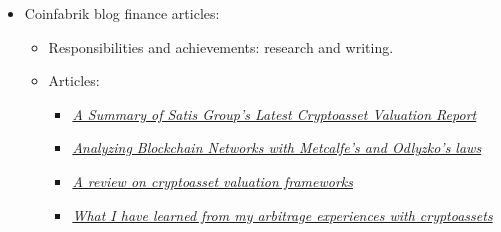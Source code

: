 \documentclass[11pt,a4paper,sans]{moderncv}        %
\begin{document}
{\begin{itemize}
\begin{itemize}
	\item Responsibilities and achievements: Product owner.
	\end{itemize}
\item Coinfabrik blog finance articles:
	\begin{itemize}%
	\item Responsibilities and achievements: research and writing.
	\item Articles:
		\begin{itemize}
		\item \href{https://blog.coinfabrik.com/a-summary-of-satis-groups-latest-cryptoasset-valuation-report/}{\textit{A Summary of Satis Group’s Latest Cryptoasset Valuation Report}}
		\item \href{https://blog.coinfabrik.com/analyzing-blockchain-networks-with-metcafes-and-odlyzkos-laws/}{\textit{Analyzing Blockchain Networks with Metcalfe’s and Odlyzko’s laws}}
		\item \href{https://blog.coinfabrik.com/a-review-on-cryptoasset-valuation-frameworks/}{\textit{A review on cryptoasset valuation frameworks}}
		\item \href{https://blog.coinfabrik.com/what-i-have-learned-from-my-arbitrage-experiences-with-cryptoassets/}{\textit{What I have learned from my arbitrage experiences with cryptoassets}}		
		\end{itemize}	
	\end{itemize}
\end{itemize}
}
\end{document}
